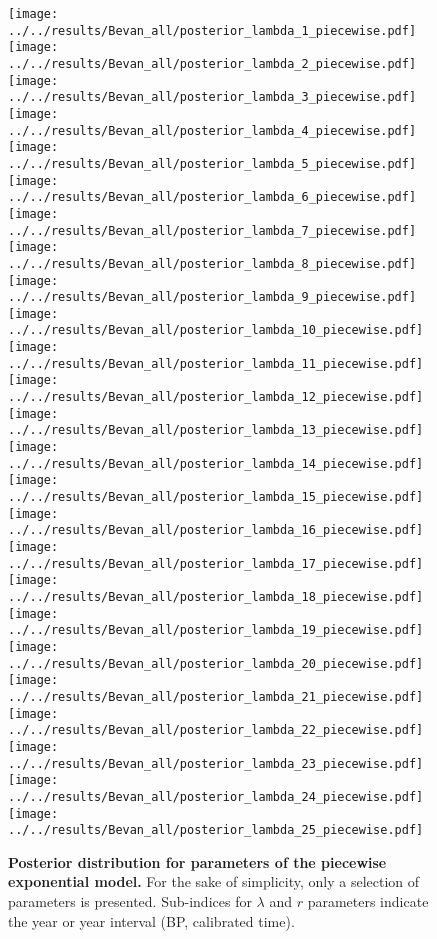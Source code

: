 \documentclass[a4paper]{article}
\begin{document}
\begin{figure}[h]
\begin{center}
\texttt{[image: ../../results/Bevan\_all/posterior\_lambda\_1\_piecewise.pdf]}\texttt{[image: ../../results/Bevan\_all/posterior\_lambda\_2\_piecewise.pdf]}\texttt{[image: ../../results/Bevan\_all/posterior\_lambda\_3\_piecewise.pdf]}\texttt{[image: ../../results/Bevan\_all/posterior\_lambda\_4\_piecewise.pdf]}\texttt{[image: ../../results/Bevan\_all/posterior\_lambda\_5\_piecewise.pdf]}
\texttt{[image: ../../results/Bevan\_all/posterior\_lambda\_6\_piecewise.pdf]}\texttt{[image: ../../results/Bevan\_all/posterior\_lambda\_7\_piecewise.pdf]}\texttt{[image: ../../results/Bevan\_all/posterior\_lambda\_8\_piecewise.pdf]}\texttt{[image: ../../results/Bevan\_all/posterior\_lambda\_9\_piecewise.pdf]}\texttt{[image: ../../results/Bevan\_all/posterior\_lambda\_10\_piecewise.pdf]}
\texttt{[image: ../../results/Bevan\_all/posterior\_lambda\_11\_piecewise.pdf]}\texttt{[image: ../../results/Bevan\_all/posterior\_lambda\_12\_piecewise.pdf]}\texttt{[image: ../../results/Bevan\_all/posterior\_lambda\_13\_piecewise.pdf]}\texttt{[image: ../../results/Bevan\_all/posterior\_lambda\_14\_piecewise.pdf]}\texttt{[image: ../../results/Bevan\_all/posterior\_lambda\_15\_piecewise.pdf]}
\texttt{[image: ../../results/Bevan\_all/posterior\_lambda\_16\_piecewise.pdf]}\texttt{[image: ../../results/Bevan\_all/posterior\_lambda\_17\_piecewise.pdf]}\texttt{[image: ../../results/Bevan\_all/posterior\_lambda\_18\_piecewise.pdf]}\texttt{[image: ../../results/Bevan\_all/posterior\_lambda\_19\_piecewise.pdf]}\texttt{[image: ../../results/Bevan\_all/posterior\_lambda\_20\_piecewise.pdf]}
\texttt{[image: ../../results/Bevan\_all/posterior\_lambda\_21\_piecewise.pdf]}\texttt{[image: ../../results/Bevan\_all/posterior\_lambda\_22\_piecewise.pdf]}\texttt{[image: ../../results/Bevan\_all/posterior\_lambda\_23\_piecewise.pdf]}\texttt{[image: ../../results/Bevan\_all/posterior\_lambda\_24\_piecewise.pdf]}\texttt{[image: ../../results/Bevan\_all/posterior\_lambda\_25\_piecewise.pdf]}
\end{center}
\caption{\textbf{Posterior distribution for parameters of the piecewise exponential model.} For the sake of simplicity, only a selection of parameters is presented. Sub-indices for $\lambda$ and $r$ parameters indicate the year or year interval (BP, calibrated time).}
\label{fig:posterior_piecewise_lambda}
\end{figure}
\end{document}
